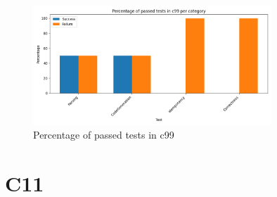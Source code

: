 \documentclass{article}
\begin{document}
\newpage
\begin{figure}[h!]
\centering
\includegraphics[width=0.8\textwidth]{../reports/artisan/images/c99_percentage.png}
\caption{Percentage of passed tests in c99}
\label{fig:c99_percentage}
\end{figure}
\newpage
\section{C11}
\end{document}
